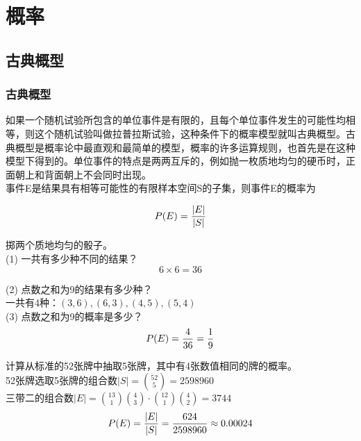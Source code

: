 \chapter{概率}

\section{古典概型}

\subsection{古典概型}

如果一个随机试验所包含的单位事件是有限的，且每个单位事件发生的可能性均相等，则这个随机试验叫做拉普拉斯试验，这种条件下的概率模型就叫古典概型。古典概型是概率论中最直观和最简单的模型，概率的许多运算规则，也首先是在这种模型下得到的。单位事件的特点是两两互斥的，例如抛一枚质地均匀的硬币时，正面朝上和背面朝上不会同时出现。\\

事件E是结果具有相等可能性的有限样本空间S的子集，则事件E的概率为

\vspace{-1cm}

\begin{align}
	P(E) = {|E| \over |S|}
\end{align}

\begin{tcolorbox}
	掷两个质地均匀的骰子。\\
	(1) 一共有多少种不同的结果？
	$$
		6 \times 6 = 36
	$$

	(2) 点数之和为9的结果有多少种？\\
	一共有4种：$ (3, 6), (6, 3), (4, 5), (5, 4) $\\

	(3) 点数之和为9的概率是多少？
	$$
		P(E) = {4 \over 36} = {1 \over 9}
	$$
\end{tcolorbox}

\begin{tcolorbox}
	计算从标准的52张牌中抽取5张牌，其中有4张数值相同的牌的概率。\\
	52张牌选取5张牌的组合数$ |S| = {52 \choose 5} = 2598960 $\\
	三带二的组合数$ |E| = {13 \choose 1}{4 \choose 3} \cdot {12 \choose 1}{4 \choose 2} = 3744 $\\
	$$
		P(E) = {|E| \over |S|} = {624 \over 2598960} \approx 0.00024
	$$
\end{tcolorbox}

